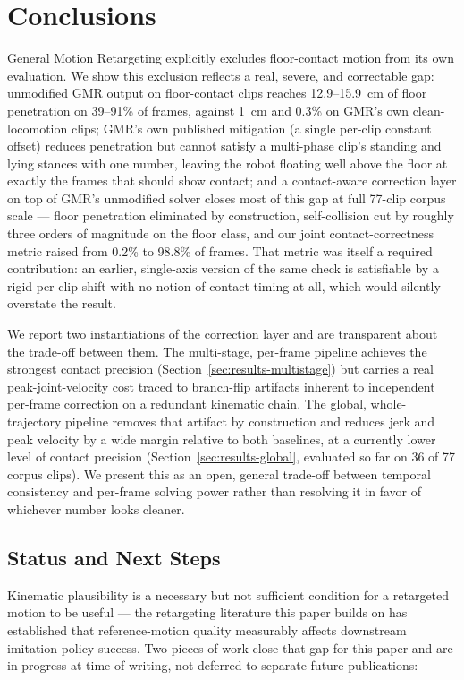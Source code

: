 \section{Conclusions}
\label{sec:conclusions}

General Motion Retargeting explicitly excludes floor-contact motion from
its own evaluation. We show this exclusion reflects a real, severe, and
correctable gap: unmodified GMR output on floor-contact clips reaches
12.9--15.9~cm of floor penetration on 39--91\% of frames, against 1~cm and
0.3\% on GMR's own clean-locomotion clips; GMR's own published mitigation
(a single per-clip constant offset) reduces penetration but cannot satisfy
a multi-phase clip's standing and lying stances with one number, leaving
the robot floating well above the floor at exactly the frames that should
show contact; and a contact-aware correction layer on top of GMR's
unmodified solver closes most of this gap at full 77-clip corpus scale ---
floor penetration eliminated by construction, self-collision cut by
roughly three orders of magnitude on the floor class, and our joint
contact-correctness metric raised from 0.2\% to 98.8\% of frames. That
metric was itself a required contribution: an earlier, single-axis version
of the same check is satisfiable by a rigid per-clip shift with no notion
of contact timing at all, which would silently overstate the result.

We report two instantiations of the correction layer and are transparent
about the trade-off between them. The multi-stage, per-frame pipeline
achieves the strongest contact precision
(Section~\ref{sec:results-multistage}) but carries a real
peak-joint-velocity cost traced to branch-flip artifacts inherent to
independent per-frame correction on a redundant kinematic chain. The
global, whole-trajectory pipeline removes that artifact by construction and
reduces jerk and peak velocity by a wide margin relative to both baselines,
at a currently lower level of contact precision
(Section~\ref{sec:results-global}, evaluated so far on 36 of 77 corpus
clips). We present this as an open, general trade-off between temporal
consistency and per-frame solving power rather than resolving it in favor
of whichever number looks cleaner.

\subsection{Status and Next Steps}
\label{sec:status-next-steps}

Kinematic plausibility is a necessary but not sufficient condition for a
retargeted motion to be useful --- the retargeting literature this paper
builds on has established that reference-motion quality measurably affects
downstream imitation-policy success. Two pieces of work close that gap for
this paper and are in progress at time of writing, not deferred to separate
future publications:

